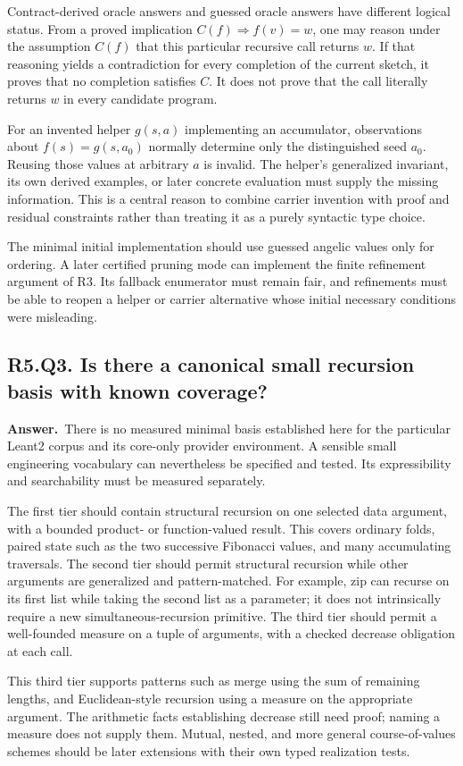 \documentclass[11pt,a4paper]{article}
\theoremstyle{definition}
\theoremstyle{remark}
\newcommand{\answer}{\par\noindent\textbf{Answer.}\ }
\newcommand{\qheading}[2]{\subsection{#1. #2}}
\begin{document}
Contract-derived oracle answers and guessed oracle answers have different
logical status. From a proved implication $C(f)\Rightarrow f(v)=w$, one may
reason under the assumption $C(f)$ that this particular recursive call returns
$w$. If that reasoning yields a contradiction for every completion of the
current sketch, it proves that no completion satisfies $C$. It does not prove
that the call literally returns $w$ in every candidate program.

For an invented helper $g(s,a)$ implementing an accumulator, observations about
$f(s)=g(s,a_0)$ normally determine only the distinguished seed $a_0$. Reusing
those values at arbitrary $a$ is invalid. The helper's generalized invariant,
its own derived examples, or later concrete evaluation must supply the missing
information. This is a central reason to combine carrier invention with proof
and residual constraints rather than treating it as a purely syntactic type
choice.

The minimal initial implementation should use guessed angelic values only for
ordering. A later certified pruning mode can implement the finite refinement
argument of R3. Its fallback enumerator must remain fair, and refinements must
be able to reopen a helper or carrier alternative whose initial necessary
conditions were misleading.

\qheading{R5.Q3}{Is there a canonical small recursion basis with known coverage?}
\answer There is no measured minimal basis established here for the particular
Leant2 corpus and its core-only provider environment. A sensible small
engineering vocabulary can nevertheless be specified and tested. Its
expressibility and searchability must be measured separately.

The first tier should contain structural recursion on one selected data
argument, with a bounded product- or function-valued result. This covers
ordinary folds, paired state such as the two successive Fibonacci values, and
many accumulating traversals. The second tier should permit structural
recursion while other arguments are generalized and pattern-matched. For
example, zip can recurse on its first list while taking the second list as a
parameter; it does not intrinsically require a new simultaneous-recursion
primitive. The third tier should permit a well-founded measure on a tuple of
arguments, with a checked decrease obligation at each call.

This third tier supports patterns such as merge using the sum of remaining
lengths, and Euclidean-style recursion using a measure on the appropriate
argument. The arithmetic facts establishing decrease still need proof; naming
a measure does not supply them. Mutual, nested, and more general course-of-values
schemes should be later extensions with their own typed realization tests.
\end{document}
